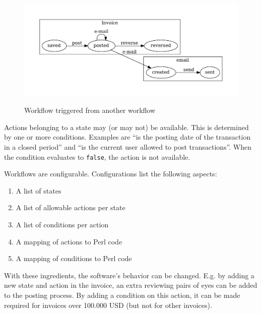 \begin{figure}[H]
\centering
\ifpdf
	 {} {
	}
\fi
\includegraphics[width=\graphicswidth]{wf1.pdf}
\caption{Workflow triggered from another workflow}
\label{fig:triggered-workflow}
\end{figure}

Actions belonging to a state may (or may not) be available. This is determined by one or
more conditions.  Examples are ``is the posting date of the transaction in a closed period''
and ``is the current user allowed to post transactions''.  When the condition evaluates to
\texttt{false}, the action is not available.

Workflows are configurable. Configurations list the following aspects:

\begin{enumerate}
	\item A list of states
	\item A list of allowable actions per state
	\item A list of conditions per action
	\item A mapping of actions to Perl code
	\item A mapping of conditions to Perl code
\end{enumerate}

With these ingredients, the software's behavior can be changed.  E.g. by adding a new state
and action in the invoice, an extra reviewing pairs of eyes can be added to the posting process.
By adding a condition on this action, it can be made required for invoices over 100.000 USD
(but not for other invoices).


